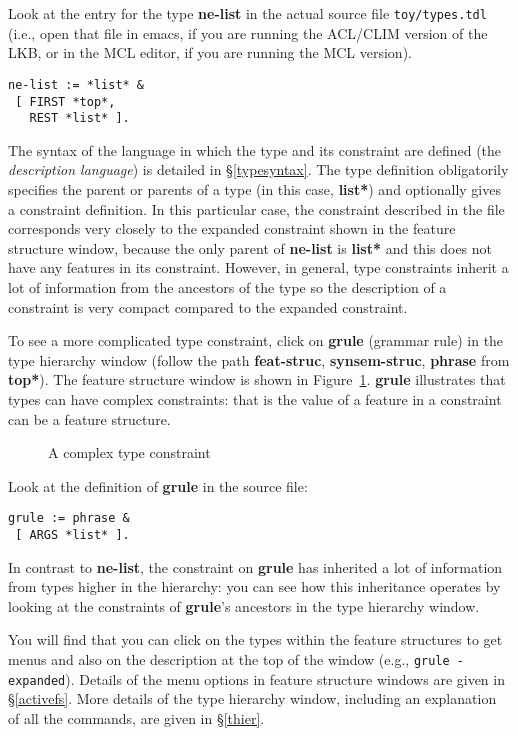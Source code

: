 \documentclass[12pt]{report}
\begin{document}
Look at the entry for the type {\bf ne-list} in the actual source
file {\tt toy/types.tdl} (i.e., open that file in emacs, if you are
running the ACL/CLIM version of the LKB, or in the MCL editor, if you are
running the MCL version).
\begin{verbatim}
ne-list := *list* &
 [ FIRST *top*,
   REST *list* ].
\end{verbatim}
The syntax of the language in which the type and its constraint
are defined (the
{\it description language}) is detailed in \S\ref{typesyntax}.
The type definition obligatorily
specifies the parent or parents of a type (in this case,
{\bf *list*}) and optionally gives a constraint definition.
In this particular case, the constraint described in the file corresponds
very closely to the expanded constraint shown in the
feature structure window, because the only parent of {\bf ne-list} is
{\bf *list*} and this does not have any features in its constraint.
However, in general, type constraints inherit a lot of information from
the ancestors of the type so the description of a constraint is very compact
compared to the expanded constraint.

To see a more complicated type constraint, 
click on {\bf grule} (grammar rule)
in the type hierarchy 
window (follow the path {\bf feat-struc}, {\bf synsem-struc}, {\bf phrase}
from {\bf *top*}).  The feature structure window is shown in
Figure~\ref{grule}.  {\bf grule} illustrates that types can have
complex constraints: that is the value of a feature in a constraint
can be a feature structure.  
\begin{figure}
\epsfxsize=1in
\caption{A complex type constraint}
\label{grule}
\end{figure}
Look at the definition of {\bf grule} in the source file:
\begin{verbatim}
grule := phrase &
 [ ARGS *list* ].
\end{verbatim}
In contrast to {\bf ne-list}, the constraint on
{\bf grule} has inherited a lot of
information from types higher in the
hierarchy: you can see how this inheritance
operates by looking at the constraints of {\bf grule}'s ancestors in the
type hierarchy window.

You will find that
you can click on the types within the feature structures to get menus
and also on the description at the top of the window
(e.g., {\tt grule - expanded}).
Details of the menu options in feature structure windows 
are given in \S\ref{activefs}.
More details of the type hierarchy window, including an explanation of all the
commands,
are given in \S\ref{thier}.
\end{document}
